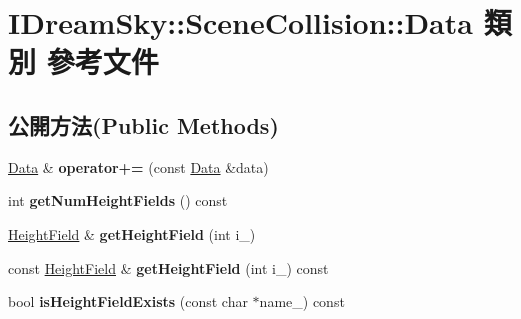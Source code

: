 \hypertarget{class_i_dream_sky_1_1_scene_collision_1_1_data}{}\section{I\+Dream\+Sky\+:\+:Scene\+Collision\+:\+:Data 類別 參考文件}
\label{class_i_dream_sky_1_1_scene_collision_1_1_data}
\subsection*{公開方法(Public Methods)}
\begin{DoxyCompactItemize}
\item 
\hyperlink{class_i_dream_sky_1_1_scene_collision_1_1_data}{Data} \& {\bfseries operator+=} (const \hyperlink{class_i_dream_sky_1_1_scene_collision_1_1_data}{Data} \&data)\hypertarget{class_i_dream_sky_1_1_scene_collision_1_1_data_adad0bf3aba3ce5245b6dc0e106baecd4}{}\label{class_i_dream_sky_1_1_scene_collision_1_1_data_adad0bf3aba3ce5245b6dc0e106baecd4}

\item 
int {\bfseries get\+Num\+Height\+Fields} () const \hypertarget{class_i_dream_sky_1_1_scene_collision_1_1_data_ac7e5cb6b77b169f5b0f247bfa217bf4a}{}\label{class_i_dream_sky_1_1_scene_collision_1_1_data_ac7e5cb6b77b169f5b0f247bfa217bf4a}

\item 
\hyperlink{class_i_dream_sky_1_1_scene_collision_1_1_height_field}{Height\+Field} \& {\bfseries get\+Height\+Field} (int i\+\_\+)\hypertarget{class_i_dream_sky_1_1_scene_collision_1_1_data_aff317f2ebd7969e8a693407087249514}{}\label{class_i_dream_sky_1_1_scene_collision_1_1_data_aff317f2ebd7969e8a693407087249514}

\item 
const \hyperlink{class_i_dream_sky_1_1_scene_collision_1_1_height_field}{Height\+Field} \& {\bfseries get\+Height\+Field} (int i\+\_\+) const \hypertarget{class_i_dream_sky_1_1_scene_collision_1_1_data_a72e2b98ceebe256dfd990ca100d67934}{}\label{class_i_dream_sky_1_1_scene_collision_1_1_data_a72e2b98ceebe256dfd990ca100d67934}

\item 
bool {\bfseries is\+Height\+Field\+Exists} (const char $\ast$name\+\_\+) const \hypertarget{class_i_dream_sky_1_1_scene_collision_1_1_data_a1440fcd728546a21f94a27bc94bebb5a}{}\label{class_i_dream_sky_1_1_scene_collision_1_1_data_a1440fcd728546a21f94a27bc94bebb5a}


\end{DoxyCompactItemize}
